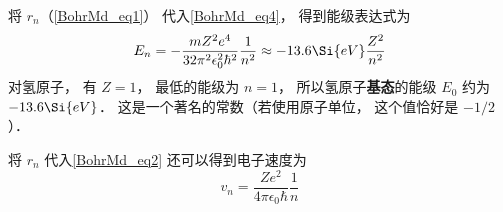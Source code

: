 将 $r_n$（\autoref{BohrMd_eq1}） 代入\autoref{BohrMd_eq4}， 得到能级表达式为
\begin{equation}\label{BohrMd_eq11}
E_n =  - \frac{mZ^2 e^4}{32\pi^2\epsilon_0^2 \hbar ^2} \frac{1}{n^2} \approx  - 13.6\Si{eV}\frac{Z^2}{n^2}
\end{equation}
对氢原子， 有 $Z = 1$， 最低的能级为 $n = 1$， 所以氢原子\textbf{基态}的能级 $E_0$ 约为 $-13.6\Si{eV}$． 这是一个著名的常数（若使用原子单位， 这个值恰好是 $-1/2$）．

将 $r_n$ 代入\autoref{BohrMd_eq2} 还可以得到电子速度为
\begin{equation}\label{BohrMd_eq10}
v_n = \frac{Z e^2}{4\pi\epsilon_0\hbar} \frac{1}{n}
\end{equation}
